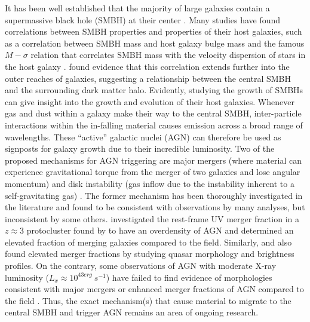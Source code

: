 \documentclass[preprint]{aastex63}
\begin{document}
It has been well established that the majority of large galaxies contain a supermassive black hole (SMBH)
at their center \citep{magorrian}. Many studies have found correlations between SMBH properties and properties of their 
host galaxies, such as a correlation between SMBH mass and host galaxy bulge mass \citep{mcconnel} and the famous $M-\sigma$ relation that correlates SMBH mass with 
the velocity dispersion of stars in the host galaxy \citep{gebhardt}. \citet{baes:2003} found evidence that this correlation extends further into the outer reaches of 
galaxies, suggesting a relationship between the central SMBH and the surrounding dark matter halo. Evidently, studying the growth of SMBHs can give insight into the growth 
and evolution of their host galaxies.  Whenever gas and dust within a galaxy make their way to the central SMBH, inter-particle interactions within the 
in-falling material causes emission across a broad range of wavelengths. These ``active'' galactic nuclei (AGN) can 
therefore be used as signposts for galaxy growth due to their incredible luminosity. 
 Two of the proposed mechanisms for AGN triggering are major mergers (where material can experience gravitational torque from the merger of two galaxies and lose angular momentum) and disk instability (gas inflow due to the instability 
inherent to a self-gravitating gas) \citep{oogi}. The former mechanism  has been thoroughly investigated in the literature and found to be consistent with observations by many analyses, but inconsistent by some others. 
\citet{hine} investigated the rest-frame UV merger fraction in a $z\approx 3$ protocluster found by \citet{lehmer} to have an overdensity of AGN and determined an elevated fraction of merging galaxies compared to the field. Similarly, \citet{fan} and \citet{glikman} 
also found elevated merger fractions by studying quasar morphology and brightness profiles. On the contrary,  some observations of AGN with moderate X-ray luminosity ($L_x \approx 10^{43 erg} \ s^{-1}$) have failed to find evidence of morphologies consistent with major mergers \citep{kocevski,cisternas:2011} 
or enhanced merger fractions of AGN compared to the field \citep{marian:2019}. Thus, the exact mechanism(s) that cause material to migrate to the central SMBH and trigger AGN remains an area of ongoing research. 
\end{document}
